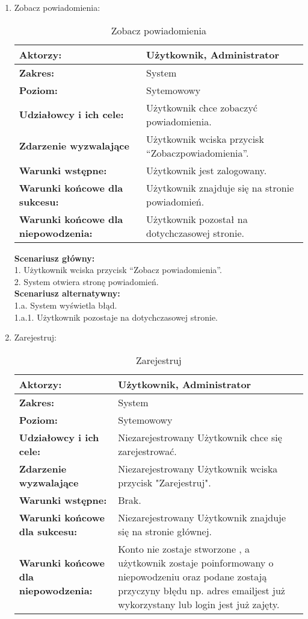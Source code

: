 \begin{enumerate}[label=(\Roman*)]
\item Zobacz powiadomienia:
	\begin{table}[h]
\centering
\caption{Zobacz powiadomienia}
\label{Zobaczpowiadomienia}
\begin{tabular}{|p{7cm}|p{7cm}|}
  \hline 
  \textbf{Aktorzy:} & Użytkownik, Administrator\\
  \hline
  \textbf{Zakres:} & System \\
	\hline
  \textbf{Poziom:} & Sytemowowy \\
	\hline
  \textbf{Udziałowcy i ich cele: } & Użytkownik chce zobaczyć powiadomienia. \\
	\hline
  \textbf{Zdarzenie wyzwalające } & Użytkownik wciska przycisk “Zobaczpowiadomienia”. \\
	\hline
  \textbf{Warunki wstępne: } & Użytkownik jest zalogowany. 
 \\
	\hline
  \textbf{Warunki końcowe dla sukcesu:} & Użytkownik znajduje się na stronie powiadomień.\\
	\hline
  \textbf{Warunki końcowe dla niepowodzenia:} & Użytkownik pozostał na dotychczasowej stronie. \\
  \hline
\end{tabular} 
\end{table}
\textbf{Scenariusz główny:}\\
1. Użytkownik wciska przycisk “Zobacz powiadomienia”.\\
2. System otwiera stronę powiadomień.\\
\textbf{Scenariusz alternatywny:}\\
1.a. System wyświetla błąd.\\
1.a.1. Użytkownik pozostaje na dotychczasowej stronie.\\

\item Zarejestruj:
	\begin{table}[h]
\centering
\caption{Zarejestruj}
\label{Zarejestruj}
\begin{tabular}{|p{7cm}|p{7cm}|}
  \hline 
  \textbf{Aktorzy:} & Użytkownik, Administrator\\
  \hline
  \textbf{Zakres:} & System \\
	\hline
  \textbf{Poziom:} & Sytemowowy \\
	\hline
  \textbf{Udziałowcy i ich cele: } & Niezarejestrowany Użytkownik chce się zarejestrować. \\
	\hline
  \textbf{Zdarzenie wyzwalające } & Niezarejestrowany Użytkownik wciska przycisk "Zarejestruj".\\
	\hline
  \textbf{Warunki wstępne: } & Brak. \\
	\hline
  \textbf{Warunki końcowe dla sukcesu:} & Niezarejestrowany Użytkownik znajduje się na stronie głównej.\\
	\hline
  \textbf{Warunki końcowe dla niepowodzenia:} & Konto nie zostaje stworzone , a użytkownik zostaje poinformowany o niepowodzeniu oraz podane zostają przyczyny błędu np. adres emailjest już wykorzystany lub login jest już zajęty. \\
  \hline
\end{tabular} 
\end{table}


\end{enumerate}
